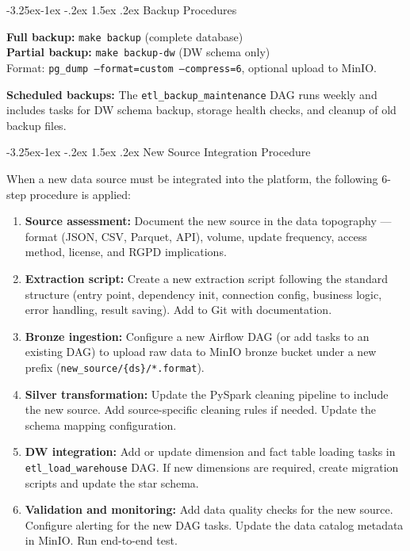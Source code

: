 \documentclass[a4paper,11pt,oneside,openany]{report}
\makeatletter
\renewcommand\subsection{\@startsection{subsection}{2}{\z@}%
  {-3.25ex\@plus -1ex \@minus -.2ex}%
  {1.5ex \@plus .2ex}%
  {\normalfont\large\bfseries\color{ntdarkgreen}}}
\newcommand{\rgpd}{RGPD}
\makeatother
\begin{document}
\subsection{Backup Procedures}

\textbf{Full backup:} \texttt{make backup} (complete database)\\
\textbf{Partial backup:} \texttt{make backup-dw} (DW schema only)\\
Format: \texttt{pg\_dump --format=custom --compress=6}, optional upload
to MinIO.

\textbf{Scheduled backups:} The \texttt{etl\_backup\_maintenance} DAG
runs weekly and includes tasks for DW schema backup, storage health
checks, and cleanup of old backup files.


\subsection{New Source Integration Procedure}

When a new data source must be integrated into the platform, the following
6-step procedure is applied:

\begin{enumerate}[nosep]
  \item \textbf{Source assessment:} Document the new source in the data
        topography --- format (JSON, CSV, Parquet, API), volume, update
        frequency, access method, license, and \rgpd{} implications.
  \item \textbf{Extraction script:} Create a new extraction script following
        the standard structure (entry point, dependency init, connection
        config, business logic, error handling, result saving). Add to
        Git with documentation.
  \item \textbf{Bronze ingestion:} Configure a new Airflow DAG (or add tasks
        to an existing DAG) to upload raw data to MinIO bronze bucket under
        a new prefix (\texttt{new\_source/\{ds\}/*.format}).
  \item \textbf{Silver transformation:} Update the PySpark cleaning pipeline
        to include the new source. Add source-specific cleaning rules if needed.
        Update the schema mapping configuration.
  \item \textbf{DW integration:} Add or update dimension and fact table
        loading tasks in \texttt{etl\_load\_warehouse} DAG. If new dimensions
        are required, create migration scripts and update the star schema.
  \item \textbf{Validation and monitoring:} Add data quality checks for the
        new source. Configure alerting for the new DAG tasks. Update the
        data catalog metadata in MinIO. Run end-to-end test.
\end{enumerate}
\end{document}
